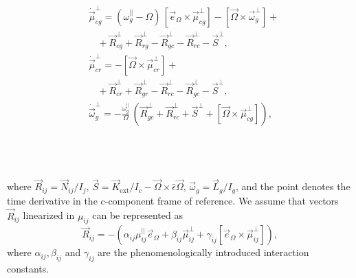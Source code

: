 \documentclass[a4paper]{jpconf}
\begin{document}
    \begin{minipage}{0.56\textwidth}
      \begin{align}
        \label{dmucg_linear_perp_eqn} 
        &\dot{\vec{\mu}}_{cg}^{\perp}  =  
          (\omega_{g}^{||} - \Omega) \, 
          [ \vec{e}_{\Omega} \times \vec{\mu}_{cg}^{\perp} ]
        - [\vec{\Omega} \times \vec{\omega}_{g}^{\perp}]
        + \\
        \nonumber
         & \ \ \ \ + \vec{R}_{cg}^{\perp} + \vec{R}_{rg}^{\perp} 
        - \vec{R}_{gc}^{\perp} - \vec{R}_{rc}^{\perp} - \vec{S}^{\perp},
        \\
        \label{dmucr_linear_perp_eqn}        
        &\dot{\vec{\mu}}_{cr}^{\perp}  =  
        - [\vec{\Omega} \times \vec{\mu}_{cr}^{\perp} ] + \\ 
        & \ \ \ \ + \vec{R}_{cr}^{\perp} + \vec{R}_{gr}^{\perp} 
        - \vec{R}_{rc}^{\perp} - \vec{R}_{gc}^{\perp} - \vec{S}^{\perp},
        \nonumber
        \\
        &\dot{\vec{\omega}}_{g}^{\perp}  = 
        - \frac{\omega_{g}^{||}}{\Omega} \,
          \left(
             \vec{R}_{gc}^{\perp} + \vec{R}_{rc}^{\perp} + \vec{S}^{\perp} 
           + [ \vec{\Omega} \times \vec{\mu}_{cg}^{\perp}]
          \right),
        \label{dLg_linear_perp_eqn}          
      \end{align}
    \end{minipage} \\ \\ \\
    where 
          $\vec{R}_{ij} = \vec{N}_{ij} / I_{j}$,
          $\vec{S} = \vec{K}_\mathrm{ext} / I_{c} - \vec{\Omega}\times \hat{\epsilon}\vec{\Omega}$,
          $\vec{\omega}_{g} = \vec{L}_{g} / I_{g}$,
          and the point denotes the time derivative in the c-component frame of reference.
    We assume that vectors $\vec{R}_{ij}$ linearized in $\mu_{ij}$ can be represented as     
    \begin{equation}
       \label{eq:R_ij}
       \vec{R}_{ij} = - \left( \alpha_{ij} {\mu}^{||}_{ij}\vec{e}_\Omega + \beta_{ij} \vec{\mu}^{\perp}_{ij}  +\gamma_{ij} [ \vec{e}_{\Omega} \times \vec{\mu}^{\perp}_{ij} ]\right),
    \end{equation}
    where $\alpha_{ij}, \beta_{ij}$ and $\gamma_{ij}$ are the phenomenologically introduced interaction constants. 
\end{document}
